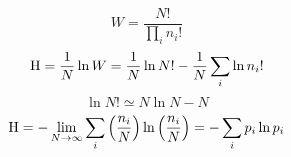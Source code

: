$$ W = \frac{N!}{\prod _{i} n_{i} !} $$
$$ {\rm H} = \frac{1}{N} \ln W = \frac{1}{N} \ln N! - \frac{1}{N} \sum _i \ln n_i ! $$
$$ \ln N! \simeq N \ln N - N $$
$$ {\rm H} = - \lim _{N \rightarrow \infty} \sum _i \left ( \frac{n_i}{N} \right) \ln \left(\frac{n_i}{N}\right) = - \sum _i p_i \ln p_i $$
